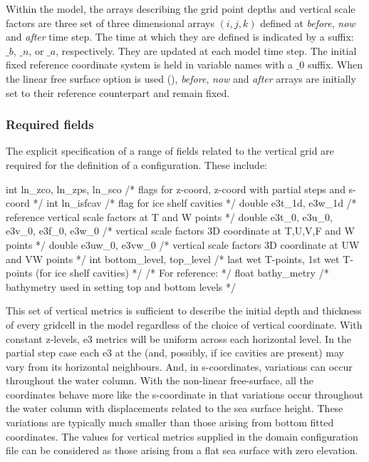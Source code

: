 \documentclass[../main/NEMO_manual]{subfiles}
\begin{document}
Within the model,
the arrays describing the grid point depths and vertical scale factors are
three set of three dimensional arrays $(i,j,k)$ defined at
\textit{before}, \textit{now} and \textit{after} time step.
The time at which they are defined is indicated by a suffix: $\_b$, $\_n$, or $\_a$, respectively.
They are updated at each model time step.
The initial fixed reference coordinate system is held in variable names with a $\_0$ suffix.
When the linear free surface option is used (),
\textit{before}, \textit{now} and \textit{after} arrays are initially set to
their reference counterpart and remain fixed.

\subsubsection{Required fields}
\label{sec:DOM_zgr_fields}

The explicit specification of a range of fields related to the vertical grid are required for
the definition of a configuration.
These include:

\begin{clines}
int    ln_zco, ln_zps, ln_sco            /* flags for z-coord, z-coord with partial steps and s-coord    */
int    ln_isfcav                         /* flag  for ice shelf cavities                                 */
double e3t_1d, e3w_1d                    /* reference vertical scale factors at T and W points           */
double e3t_0, e3u_0, e3v_0, e3f_0, e3w_0 /* vertical scale factors 3D coordinate at T,U,V,F and W points */
double e3uw_0, e3vw_0                    /* vertical scale factors 3D coordinate at UW and VW points     */
int    bottom_level, top_level           /* last wet T-points, 1st wet T-points (for ice shelf cavities) */
                                         /* For reference:                                               */
float  bathy_metry                       /* bathymetry used in setting top and bottom levels             */
\end{clines}

This set of vertical metrics is sufficient to describe the initial depth and thickness of
every gridcell in the model regardless of the choice of vertical coordinate.
With constant z-levels, e3 metrics will be uniform across each horizontal level.
In the partial step case each e3 at the 
(and, possibly,  if ice cavities are present)
may vary from its horizontal neighbours.
And, in s-coordinates, variations can occur throughout the water column.
With the non-linear free-surface, all the coordinates behave more like the s-coordinate in that
variations occur throughout the water column with displacements related to the sea surface height.
These variations are typically much smaller than those arising from bottom fitted coordinates.
The values for vertical metrics supplied in the domain configuration file can be considered as
those arising from a flat sea surface with zero elevation.
\end{document}
